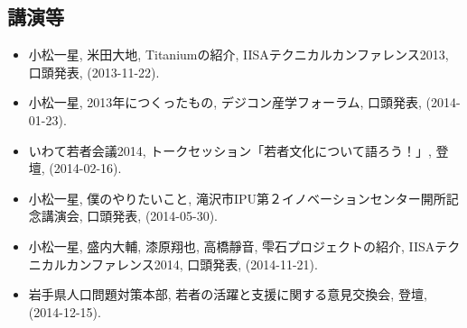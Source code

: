 \documentclass{jsarticle}
\begin{document}
\subsection*{講演等}

\begin{itemize}
\item 小松一星, 米田大地, Titaniumの紹介, IISAテクニカルカンファレンス2013, 口頭発表, (2013-11-22).
\item 小松一星, 2013年につくったもの, デジコン産学フォーラム, 口頭発表, (2014-01-23).
\item いわて若者会議2014, トークセッション「若者文化について語ろう！」, 登壇, (2014-02-16).
\item 小松一星, 僕のやりたいこと, 滝沢市IPU第２イノベーションセンター開所記念講演会, 口頭発表, (2014-05-30).
\item 小松一星, 盛内大輔, 漆原翔也, 高橋靜音, 雫石プロジェクトの紹介, IISAテクニカルカンファレンス2014, 口頭発表, (2014-11-21).
\item 岩手県人口問題対策本部, 若者の活躍と支援に関する意見交換会, 登壇, (2014-12-15).
\end{itemize}
\end{document}

